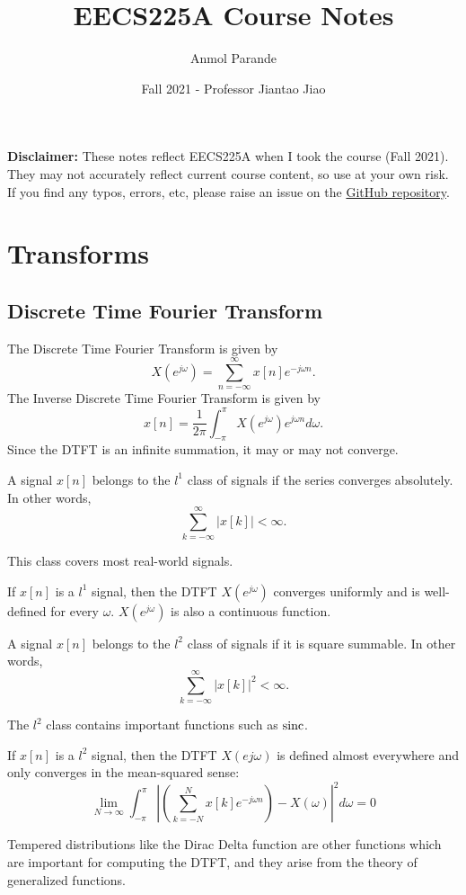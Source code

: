 

\title{EECS225A Course Notes}
\author{Anmol Parande}
\date{Fall 2021 - Professor Jiantao Jiao}
\maketitle
\textbf{Disclaimer: }These notes reflect EECS225A when I took the course (Fall 2021). They may not accurately reflect current course content, so use at your own risk.
If you find any typos, errors, etc, please raise an issue on the \href{https://github.com/parandea17/BerkeleyNotes}{GitHub repository}.
\tableofcontents
\newpage
\section{Transforms}
\subsection{Discrete Time Fourier Transform}
The Discrete Time Fourier Transform is given by \[
	X(e^{j\omega}) = \sum_{n=-\infty}^{\infty}x[n]e^{-j\omega n}.
\]
The Inverse Discrete Time Fourier Transform is given by \[
	x[n] = \frac{1}{2\pi}\int_{-\pi}^{\pi}X(e^{j\omega})e^{j\omega n}d\omega.
\]
Since the DTFT is an infinite summation, it may or may not converge.
\begin{definition}
	A signal $x[n]$ belongs to the $l^1$ class of signals if the series converges absolutely. In other words,
	\[
		\sum_{k=-\infty}^{\infty}|x[k]| < \infty.
	\]
	\label{defn:l1-class}
\end{definition}
This class covers most real-world signals.
\begin{theorem}
	If $x[n]$ is a $l^1$ signal, then the DTFT $X(e^{j\omega})$ converges uniformly and is well-defined for every $\omega$. $X(e^{j\omega})$ is also a continuous function.
	\label{thm:l1-dtft}
\end{theorem}
\begin{definition}
	A signal $x[n]$ belongs to the $l^2$ class of signals if it is square summable. In other words,
	\[
		\sum_{k=-\infty}^{\infty}|x[k]|^2 < \infty.
	\]
	\label{defn:l2-class}
\end{definition}
The $l^2$ class contains important functions such as $\operatorname*{sinc}$.
\begin{theorem}
	If $x[n]$ is a $l^2$ signal, then the DTFT $X(e{j\omega})$ is defined almost everywhere and only converges in the mean-squared sense:
	\[
		\lim_{N\to\infty} \int_{-\pi}^{\pi}\left|\left(\sum_{k=-N}^N x[k]e^{-j\omega n}\right) - X(\omega)\right|^2d\omega = 0
	\]
	\label{thm:l2-dtft}
\end{theorem}
Tempered distributions like the Dirac Delta function are other functions which are important for computing the DTFT, and they arise from the theory of generalized functions.
